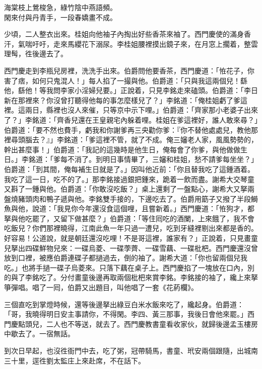 \begin{myquote}
海棠枝上鶯梭急，綠竹陰中燕語頻。\\閑來付與丹青手，一段春嬌畫不成。
\end{myquote}

少頃，二人整衣出來。桂姐向他袖子內掏出好些香茶來袖了。西門慶使的滿身香汗，氣喘吁吁，走來馬纓花下溺尿。李桂姐腰裡摸出鏡子來，{}在月窓上擱着，整雲理髩，徃後邊去了。

西門慶走到李瓶兒房裡，洗洗手出來。伯爵問他要香茶，西門慶道：「恠花子，你害了痞，如何只鬼混人！」每人掐了一撮與他。伯爵道：「只與我這兩個兒！繇他，繇他！等我問李家小淫婦兒要。」正說着，只見李銘走來磕頭。伯爵道：「李日新在那裡來？你沒曾打聽得他每的事怎麼樣兒了？」李銘道：「俺桂姐虧了爹這裡。這兩日，縣裡也沒人來催，只等京中示下哩。」伯爵道：「齊家那小老婆子出來了？」李銘道：「齊香兒還在王皇親宅內躲着哩。桂姐在爹這裡好，誰人敢來尋？」伯爵道：「要不然也費手，虧我和你謝爹再三央勸你爹：『你不替他處處兒，教他那裡尋頭腦去？』」李銘道：「爹這裡不管，就了不成。俺三嬸老人家，風風勢勢的，幹出甚麼事！」伯爵道：「我記的這幾時是他生日，{}俺每會了你爹，與他做做生日。」{}李銘道：「爹每不消了。到明日事情畢了，三嬸和桂姐，愁不請爹每坐坐？」伯爵道：「到其間，俺每補生日就是了。」{}因叫他近前：「你且替我吃了這鍾酒着。我吃了這一日，吃不的了。」那李銘接過銀把鍾來，跪着一飲而盡。謝希大交琴童又斟了一鍾與他。伯爵道：「你敢沒吃飯？」桌上還剩了一盤點心，謝希大又拏兩盤燒豬頭肉和鴨子遞與他。李銘雙手接的，下邊吃去了。伯爵用筯子又撥了半段鰣魚與他，說道：「我見你今年還沒食這個哩，且嘗新着。」西門慶道：「恠狗才，都拏與他吃罷了，又留下做甚麼？」伯爵道：「等住囘吃的酒闌，上來餓了，我不會吃飯兒？你們那裡曉得，江南此魚一年只過一遭兒，吃到牙縫裡剔出來都是香的。好容易！公道說，就是朝廷還沒吃哩！不是哥這裡，誰家有？」{}正說着，只見畫童兒拏出四碟鮮物兒來：一碟烏菱、一碟荸薺、一碟雪藕、一碟枇杷。西門慶還沒曾放到口裡，被應伯爵連碟子都撾過去，倒的袖了。謝希大道：「你也留兩個兒我吃。」也將手撾一碟子烏菱來。只落下藕在桌子上。西門慶掐了一塊放在口內，別的與了李銘吃了。分付畫童後邊再取兩個枇杷來賞李銘。李銘接的袖了，纔上來拏箏彈唱。唱了一囘，伯爵又出題目，叫他唱了一套《花葯欄》。

三個直吃到掌燈時候，還等後邊拏出綠豆白米水飯來吃了，纔起身。伯爵道：「哥，我曉得明日安主事請你，不得閑。李四、黃三那事，我後日會他來罷。」{}西門慶點頭兒，二人也不等送，就去了。西門慶教書童看收家伙，就歸後邊孟玉樓房中歇去了。一宿無話。

到次日早起，也沒徃衙門中去，吃了粥，冠帶騎馬，書童、玳安兩個跟隨，出城南三十里，逕徃劉太監庄上來赴席，不在話下。

